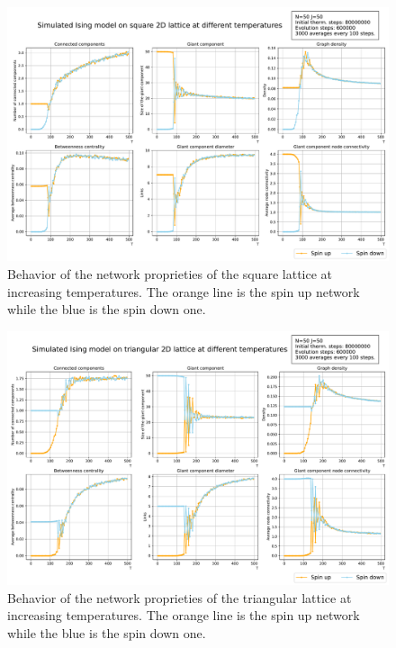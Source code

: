 \begin{figure}[!htb]
  \includegraphics[width=\linewidth]{Network meausres/Square_Network.pdf}
    \caption{Behavior of the network proprieties of the square lattice at increasing temperatures. The orange line is the spin up network while the blue is the spin down one.}
    \label{Fig:squareNetworkmeasure}
\end{figure}

\begin{figure}[!htb]
  \includegraphics[width=.96\linewidth]{Network meausres/Triangular_Network.pdf}
    \caption{Behavior of the network proprieties of the triangular lattice at increasing temperatures. The orange line is the spin up network while the blue is the spin down one.}
    \label{Fig:triangularNetworkmeasure}
\end{figure}

